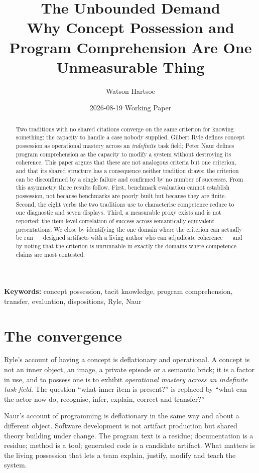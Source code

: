 \documentclass[11pt,a4paper]{article}
\title{\textbf{The Unbounded Demand}\\[.35em]\large Why Concept Possession and Program Comprehension Are One Unmeasurable Thing}
\author{Watson Hartsoe}
\date{2026-08-19 \quad\textemdash\quad Working Paper}
\begin{document}
\maketitle
\begin{abstract}\noindent Two traditions with no shared citations converge on the same criterion for knowing something: the capacity to handle a case nobody supplied. Gilbert Ryle defines concept possession as operational mastery across an \emph{indefinite} task field; Peter Naur defines program comprehension as the capacity to modify a system without destroying its coherence. This paper argues that these are not analogous criteria but one criterion, and that its shared structure has a consequence neither tradition draws: the criterion can be disconfirmed by a single failure and confirmed by no number of successes. From this asymmetry three results follow. First, benchmark evaluation cannot establish possession, not because benchmarks are poorly built but because they are finite. Second, the eight verbs the two traditions use to characterise competence reduce to one diagnostic and seven displays. Third, a measurable proxy exists and is not reported: the item-level correlation of success across semantically equivalent presentations. We close by identifying the one domain where the criterion can actually be run --- designed artifacts with a living author who can adjudicate coherence --- and by noting that the criterion is unrunnable in exactly the domains where competence claims are most contested.\end{abstract}
\vspace{-.5em}\noindent\textbf{Keywords:} concept possession, tacit knowledge, program comprehension, transfer, evaluation, dispositions, Ryle, Naur\par\vspace{1em}
\section{The convergence}
Ryle's account of having a concept is deflationary and operational. A concept is not an inner object, an image, a private episode or a semantic brick; it is a factor in use, and to possess one is to exhibit \emph{operational mastery across an indefinite task field}. The question ``what inner item is present?'' is replaced by ``what can the actor now do, recognise, infer, explain, correct and transfer?''

Naur's account of programming is deflationary in the same way and about a different object. Software development is not artifact production but shared theory building under change. The program text is a residue; documentation is a residue; method is a tool; generated code is a candidate artifact. What matters is the living possession that lets a team explain, justify, modify and teach the system.
\end{document}
